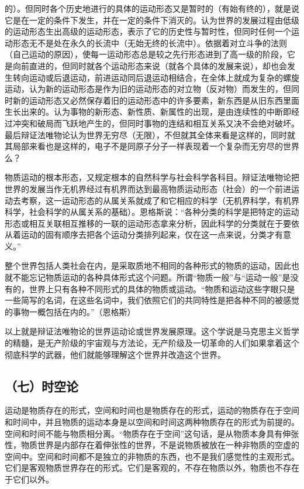 的）。但同时各个历史地进行的具体的运动形态又是暂时的（有始有终的），就是说它是在一定的条件下发生，并在一定的条件下消灭的。认为世界的发展过程由低级的运动形态生出高级的运动形态，表示了它的历史性与暂时性，但同时任何一个运动形态无不是处在永久的长流中（无始无终的长流中）。依据着对立斗争的法则（自己运动的原因），使每一运动形态总是较之先行形态进到了高一级的阶段，它是向前直进的，但同时就各个运动形态来说（就各个具体的发展来说），却也会发生转向运动或后退运动，前进运动同后退运动相结合，在全体上就成为复杂的螺旋运动，认为新的运动形态是作为旧的运动形态的对立物（反对物）而发生的，但同时新的运动形态又必然保存着旧的运动形态中的许多要素，新东西是从旧东西里面生长出来的。认为事物的新形态、新性质、新属性的出现，是由连续性的中断即经过冲突和破局而飞跃地产生的，但同时事物的连结和相互关系又决不会绝对破坏。最后辩证法唯物论认为世界无穷尽（无限），不但就其全体来看是这样的，同时就其局部来看也是这样的，电子不是同原子分子一样表现着一个复杂而无穷尽的世界么？

物质运动的根本形态，又规定根本的自然科学与社会科学各科目。辩证法唯物论把世界的发展当作无机界经过有机界而达到最高物质运动形态（社会）的一个前进运动去考察，这一运动形态的从属关系就成了和它相应的科学（无机界科学，有机界科学，社会科学的从属关系的基础）。恩格斯说：“各种分类的科学是把特定的运动形态或相互关联相互推移的一联的运动形态拿来分析，因此科学的分类就在于要依从着运动的固有顺序去把各个运动分类排列起来，仅在这一点来说，分类才有意义。”

整个世界包括人类社会在内，是采取质地不相同的各种形式的物质的运动，因此也就不能忘记物质运动的各种具体形式这个问题。所谓“物质一般”与“运动一般”是没有的，世界上只有各种不同形式的具体的物质或运动。“物质和运动这些字眼只是一些简写的名词，在这些名词中，我们依照它们的共同特性是把各种不同的被感觉的事物一概包括在内的。”（恩格斯）

以上就是辩证法唯物论的世界运动论或世界发展原理。这个学说是马克思主义哲学的精髓，是无产阶级的宇宙观与方法论，无产阶级及一切革命的人们如果拿着这个彻底科学的武器，他们就能够理解这个世界并改造这个世界。

\subsection{（七）时空论}

运动是物质存在的形式，空间和时间也是物质存在的形式，运动的物质存在于空间和时间中，并且物质的运动本身是以空间和时间这两种物质存在的形式为前提的。空间和时间不能与物质相分离。“物质存在于空间”这句话，是从物质本身具有伸张性，物质世界是内部存在着伸张性的世界，不是说物质被放在一种非物质的空虚的空间中。空间和时间都不是独立的非物质的东西，也不是我们感觉性的主观形式。它们是客观物质世界存在的形式。它们是客观的，不存在物质以外，物质也不存在于它们以外。

